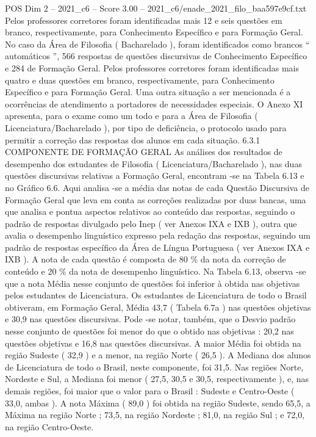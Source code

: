 \begin{textsample}{POS Dim 2 – 2021\_c6 – Score 3.00 – 2021\_c6/enade\_2021\_filo\_baa597e9cf.txt}
Pelos professores corretores foram identificadas mais 12 e seis questões em branco, respectivamente, para Conhecimento Específico e para Formação Geral.
No caso da Área de Filosofia ( Bacharelado ), foram identificados como brancos “ automáticos ”, 566 respostas de questões discursivas de Conhecimento Específico e 284 de Formação Geral.
Pelos professores corretores foram identificadas mais quatro e duas questões em branco, respectivamente, para Conhecimento Específico e para Formação Geral.
Uma outra situação a ser mencionada é a ocorrências de atendimento a portadores de necessidades especiais.
O Anexo XI apresenta, para o exame como um todo e para a Área de Filosofia ( Licenciatura/Bacharelado ), por tipo de deficiência, o protocolo usado para permitir a correção das respostas dos alunos em cada situação. 6.3.1 COMPONENTE DE FORMAÇÃO GERAL As análises dos resultados de desempenho dos estudantes de Filosofia ( Licenciatura/Bacharelado ), nas duas questões discursivas relativas a Formação Geral, encontram -se na Tabela 6.13 e no Gráfico 6.6.
Aqui analisa -se a média das notas de cada Questão Discursiva de Formação Geral que leva em conta as correções realizadas por duas bancas, uma que analisa e pontua aspectos relativos ao conteúdo das respostas, seguindo o padrão de respostas divulgado pelo Inep ( ver Anexos IXA e IXB ), outra que avalia o desempenho linguístico expresso pela redação das respostas, seguindo um padrão de respostas específico da Área de Língua Portuguesa ( ver Anexos IXA e IXB ).
A nota de cada questão é composta de 80 \% da nota da correção de conteúdo e 20 \% da nota de desempenho linguístico.
Na Tabela 6.13, observa -se que a nota Média nesse conjunto de questões foi inferior à obtida nas objetivas pelos estudantes de Licenciatura.
Os estudantes de Licenciatura de todo o Brasil obtiveram, em Formação Geral, Média 43,7 ( Tabela 6.7a ) nas questões objetivas e 30,9 nas questões discursivas.
Pode -se notar, também, que o Desvio padrão nesse conjunto de questões foi menor do que o obtido nas objetivas : 20,2 nas questões objetivas e 16,8 nas questões discursivas.
A maior Média foi obtida na região Sudeste ( 32,9 ) e a menor, na região Norte ( 26,5 ).
A Mediana dos alunos de Licenciatura de todo o Brasil, neste componente, foi 31,5.
Nas regiões Norte, Nordeste e Sul, a Mediana foi menor ( 27,5, 30,5 e 30,5, respectivamente ), e, nas demais regiões, foi maior que o valor para o Brasil : Sudeste e Centro-Oeste ( 33,0, ambas ).
A nota Máxima ( 89,0 ) foi obtida na região Sudeste, sendo 65,5, a Máxima na região Norte ; 73,5, na região Nordeste ; 81,0, na região Sul ; e 72,0, na região Centro-Oeste.

\end{textsample}
